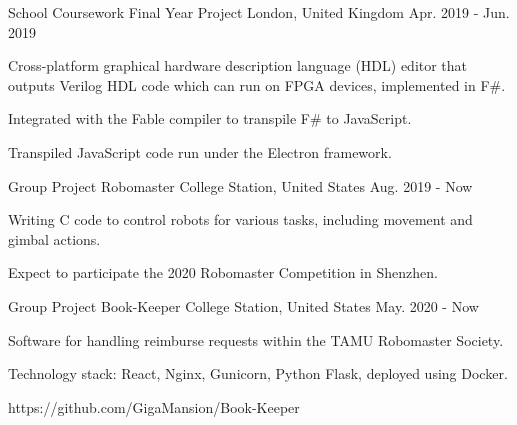 \begin{cventries}
    \cventry
    {School Coursework} %
    {Final Year Project} %
    {London, United Kingdom} %
    {Apr. 2019 - Jun. 2019} %
    {
      \begin{cvitems} %
        \item {Cross-platform graphical hardware description language (HDL) editor that outputs Verilog HDL code which can run on FPGA devices, implemented in F\#.}
        \item {Integrated with the Fable compiler to transpile F\# to JavaScript.}
        \item {Transpiled JavaScript code run under the Electron framework.}
      \end{cvitems}
    }
    
    \cventry
    {Group Project} %
    {Robomaster} %
    {College Station, United States} %
    {Aug. 2019 - Now} %
    {
      \begin{cvitems} %
        \item {Writing C code to control robots for various tasks, including movement and gimbal actions.}
        \item {Expect to participate the 2020 Robomaster Competition in Shenzhen.}
      \end{cvitems}
    }
    
    \cventry
    {Group Project}
    {Book-Keeper}
    {College Station, United States}
    {May. 2020 - Now}
    {
        \begin{cvitems}
            \item Software for handling reimburse requests within the TAMU Robomaster Society.
            \item Technology stack: React, Nginx, Gunicorn, Python Flask, deployed using Docker.
            \item https://github.com/GigaMansion/Book-Keeper
        \end{cvitems}
    }

\end{cventries}